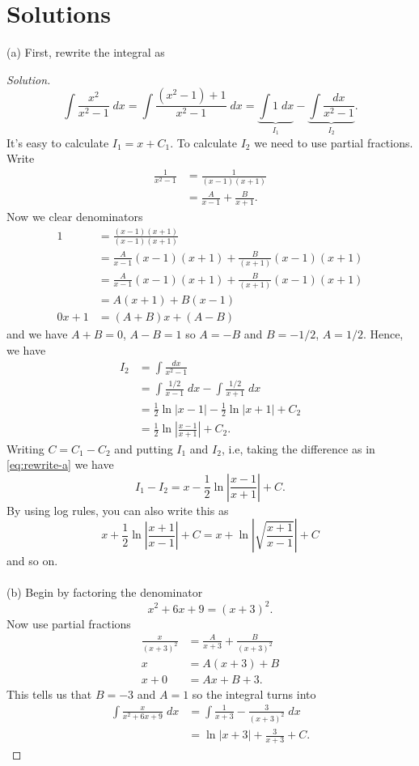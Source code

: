\documentclass[12pt]{article}
\theoremstyle{plain}
\theoremstyle{definition}
\theoremstyle{remark}
\begin{document}
\section*{Solutions}
(a)  First, rewrite the integral as
\begin{proof}[Solution]
\begin{equation}
\label{eq:rewrite-a}
\int\frac{x^2}{x^2-1}\;dx=
\int\frac{(x^2-1)+1}{x^2-1}\;dx=
\underbrace{\int 1\;dx}_{I_1}-\underbrace{\int\frac{dx}{x^2-1}}_{I_2}.
\end{equation}
It's easy to calculate $I_1=x+C_1$. To calculate $I_2$ we need to use
partial fractions. Write
\begin{align*}
\frac{1}{x^2-1}
&=\frac{1}{(x-1)(x+1)}\\
&=\frac{A}{x-1}+\frac{B}{x+1}.
\end{align*}
Now we clear denominators
\begin{align*}
1&=\frac{(x-1)(x+1)}{(x-1)(x+1)}\\
&=\frac{A}{x-1}(x-1)(x+1)+\frac{B}{(x+1)}(x-1)(x+1)\\
&=\frac{A}{x-1}(x-1)(x+1)+\frac{B}{(x+1)}(x-1)(x+1)\\
&=A(x+1)+B(x-1)\\
0x+1&=(A+B)x+(A-B)
\end{align*}
and we have $A+B=0$, $A-B=1$ so $A=-B$ and $B=-1/2$, $A=1/2$. Hence, we
have
\begin{align*}
I_2
&=\int\frac{dx}{x^2-1}\\
&=\int\frac{1/2}{x-1}\;dx-\int\frac{1/2}{x+1}\;dx\\
&=\frac{1}{2}\ln|x-1|-\frac{1}{2}\ln|x+1|+C_2\\
&=\frac{1}{2}\ln\left|\frac{x-1}{x+1}\right|+C_2.
\end{align*}
Writing $C=C_1-C_2$ and putting $I_1$ and $I_2$, i.e, taking the difference
as in \eqref{eq:rewrite-a} we have
\[
\boxed{I_1-I_2=x-\frac{1}{2}\ln\left|\frac{x-1}{x+1}\right|+C.}
\]
By using log rules, you can also write this as
\[
x+\frac{1}{2}\ln\left|\frac{x+1}{x-1}\right|+C
=x+\ln\left|\sqrt{\frac{x+1}{x-1}}\right|+C
\]
and so on.
\\\\
(b) Begin by factoring the denominator
\begin{equation}
  \label{eq:factor-denom-b}
x^2+6x+9=(x+3)^2.
\end{equation}
Now use partial fractions
\begin{align*}
\frac{x}{(x+3)^2}&=\frac{A}{x+3}+\frac{B}{(x+3)^2}\\
x&=A(x+3)+B\\
x+0&=Ax+B+3.
\end{align*}
This tells us that $B=-3$ and $A=1$ so the integral turns into
\begin{align*}
\int\frac{x}{x^2+6x+9}\;dx
&=\int\frac{1}{x+3}-\frac{3}{(x+3)^2}\;dx\\
&=\boxed{\ln|x+3|+\frac{3}{x+3}+C.}
\end{align*}


\end{proof}
\end{document}
